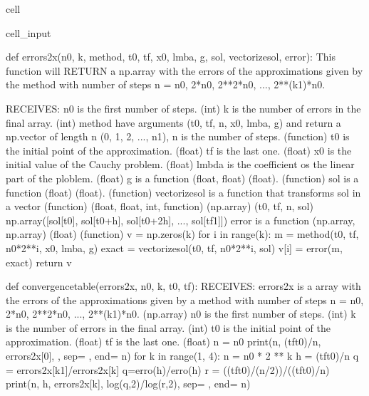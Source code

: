 \documentclass[letterpaper,10pt,english]{jupyterBook}
\begin{document}
\begin{sphinxuseclass}{cell}
\begin{sphinxVerbatimInput}
\begin{sphinxuseclass}{cell_input}
\begin{sphinxVerbatim}[commandchars=\\\{\}]
def errors\PYGZus{}2x(n0, k, method, t0, tf, x0, lmba, g, sol, vectorize\PYGZus{}sol, error):
  \PYGZsq{}\PYGZsq{}\PYGZsq{}
  This function will RETURN a np.array with the errors of the approximations given
  by the method with number of steps n = n0, 2*n0, 2**2*n0, ..., 2**(k\PYGZhy{}1)*n0.

  RECEIVES:
  n0 is the first number of steps. (int)
  k is the number of errors in the final array. (int)
  method have arguments (t0, tf, n, x0, lmba, g) and return a
  np.vector of length n (0, 1, 2, ..., n\PYGZhy{}1), n is the number of steps. (function)
  t0 is the initial point of the approximation. (float)
  tf is the last one. (float)
  x0 is the initial value of the Cauchy problem. (float)
  lmbda is the coefficient os the linear part of the ploblem. (float)
  g is a function (float, float) \PYGZhy{}\PYGZgt{} (float). (function)
  sol is a function (float) \PYGZhy{}\PYGZgt{} (float). (function)
  vectorize\PYGZus{}sol is a function that \PYGZdq{}transforms sol in a vector\PYGZdq{} (function)
  (float, float, int, function) \PYGZhy{}\PYGZgt{} (np.array)
  (t0, tf, n, sol) \PYGZhy{}\PYGZgt{} np.array([sol[t0], sol[t0+h], sol[t0+2h], ..., sol[tf\PYGZhy{}1]])
  error is a function (np.array, np.array) \PYGZhy{}\PYGZgt{} (float) (function)
  \PYGZsq{}\PYGZsq{}\PYGZsq{}
  v = np.zeros(k)
  for i in range(k):
    m = method(t0, tf, n0*2**i, x0, lmba, g)
    exact = vectorize\PYGZus{}sol(t0, tf, n0*2**i, sol)
    v[i] = error(m, exact)
  return v

def convergence\PYGZus{}table(errors\PYGZus{}2x, n0, k, t0, tf):
  \PYGZsq{}\PYGZsq{}\PYGZsq{}
  RECEIVES:
  errors\PYGZus{}2x is a array with the errors of the approximations given
  by a method with number of steps n = n0, 2*n0, 2**2*n0, ..., 2**(k\PYGZhy{}1)*n0. (np.array)
  n0 is the first number of steps. (int)
  k is the number of errors in the final array. (int)
  t0 is the initial point of the approximation. (float)
  tf is the last one. (float)
  \PYGZsq{}\PYGZsq{}\PYGZsq{}
  n = n0
  print(n, (tf\PYGZhy{}t0)/n, errors\PYGZus{}2x[0], \PYGZdq{}\PYGZhy{}\PYGZdq{}, sep=\PYGZdq{} \PYGZam{} \PYGZdq{}, end=\PYGZdq{} \PYGZbs{}\PYGZbs{}\PYGZbs{}\PYGZbs{} \PYGZbs{}n\PYGZdq{})
  for k in range(1, 4):
      n = n0 * 2 ** k
      h = (tf\PYGZhy{}t0)/n
      q = errors\PYGZus{}2x[k\PYGZhy{}1]/errors\PYGZus{}2x[k] \PYGZsh{}q=erro(h)/erro(h)
      r = ((tf\PYGZhy{}t0)/(n/2))/((tf\PYGZhy{}t0)/n)
      print(n, h, errors\PYGZus{}2x[k], log(q,2)/log(r,2), sep=\PYGZdq{} \PYGZam{} \PYGZdq{}, end=\PYGZdq{} \PYGZbs{}\PYGZbs{}\PYGZbs{}\PYGZbs{} \PYGZbs{}n\PYGZdq{})
\end{sphinxVerbatim}

\end{sphinxuseclass}\end{sphinxVerbatimInput}

\end{sphinxuseclass}
\end{document}
